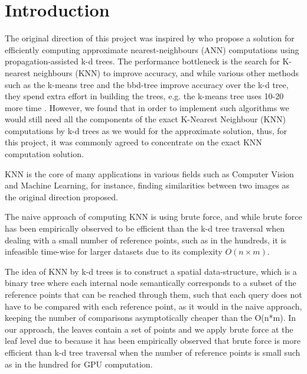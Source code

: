 \section{Introduction}
\label{sec:intro}




The original direction of this project was inspired by \cite{kdann} who propose a solution for efficiently computing approximate nearest-neighbours (ANN) computations using propagation-assisted k-d trees. The performance bottleneck is the search for K-nearest neighbours (KNN) to improve accuracy, and while various other methods such as the k-means tree and the bbd-tree improve accuracy over the k-d tree, they spend extra effort in building the trees, e.g. the k-means tree uses 10-20 more time \cite{kdann}. However, we found that in order to implement such algorithms we would still need all the components of the exact K-Nearest Neighbour (KNN) computations by k-d trees as we would for the approximate solution, thus, for this project, it was commonly agreed to concentrate on the exact KNN computation solution. 


KNN is the core of many applications in various fields such as Computer Vision and Machine Learning, for instance, finding similarities between two images as the original direction proposed. 

The naive approach of computing KNN is using brute force, and while brute force has been empirically observed to be efficient than the k-d tree traversal when dealing with a small number of reference points, such as in the hundreds, it is infeasible time-wise for larger datasets due to its complexity $O(n \times m)$. 

The idea of KNN by k-d trees is to construct a spatial data-structure, which is a binary tree where each internal node semantically corresponds to a subset of the reference points that can be reached through them, such that each query does not have to be compared with each reference point, as it would in the naive approach, keeping the number of comparisons asymptotically cheaper than the O(n*m). In our approach, the leaves contain a set of points and we apply brute force at the leaf level due to because it has been empirically observed that brute force is more efficient than k-d tree traversal when the number of reference points is small such as in the hundred for GPU computation. 

